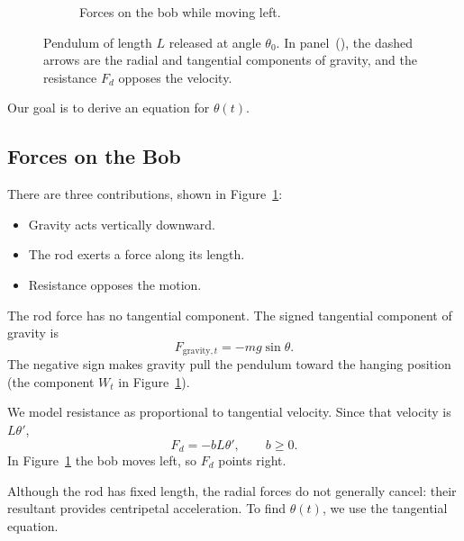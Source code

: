 \documentclass[11pt,letterpaper]{article}
\begin{document}
\begin{figure}[H]
\begin{subfigure}[t]{0.48\textwidth}
    \caption{Forces on the bob while moving left.}
    \label{fig:pend-forces}
\end{subfigure}
\caption{Pendulum of length $L$ released at angle $\theta_0$.
In panel~(), the dashed arrows are the radial and
tangential components of gravity, and the resistance $F_d$ opposes the
velocity.}
\label{fig:pendulum}
\end{figure}

Our goal is to derive an equation for $\theta(t)$.

\subsection{Forces on the Bob}

There are three contributions, shown in
Figure~\ref{fig:pend-forces}:
\begin{itemize}
    \item Gravity acts vertically downward.
    \item The rod exerts a force along its length.
    \item Resistance opposes the motion.
\end{itemize}

The rod force has no tangential component.
The signed tangential component of gravity is
\[
F_{\mathrm{gravity},t}=-mg\sin\theta.
\]
The negative sign makes gravity pull the pendulum
toward the hanging position (the component $W_t$ in
Figure~\ref{fig:pend-forces}).

We model resistance as proportional to tangential
velocity. Since that velocity is $L\theta'$,
\[
F_d=-bL\theta',
\qquad b\ge0.
\]
In Figure~\ref{fig:pend-forces} the bob moves left, so $F_d$ points right.

Although the rod has fixed length, the radial forces
do not generally cancel: their resultant provides
centripetal acceleration. To find $\theta(t)$,
we use the tangential equation.

\end{document}
